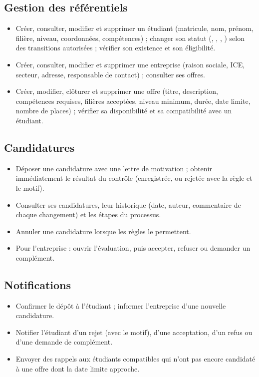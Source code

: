 \subsection{Gestion des référentiels}
\begin{itemize}
  \item Créer, consulter, modifier et supprimer un étudiant (matricule, nom, prénom, filière, niveau, coordonnées, compétences) ; changer son statut (, , , ) selon des transitions autorisées ; vérifier son existence et son éligibilité.
  \item Créer, consulter, modifier et supprimer une entreprise (raison sociale, ICE, secteur, adresse, responsable de contact) ; consulter ses offres.
  \item Créer, modifier, clôturer et supprimer une offre (titre, description, compétences requises, filières acceptées, niveau minimum, durée, date limite, nombre de places) ; vérifier sa disponibilité et sa compatibilité avec un étudiant.
\end{itemize}

\subsection{Candidatures}
\begin{itemize}
  \item Déposer une candidature avec une lettre de motivation ; obtenir immédiatement le résultat du contrôle (enregistrée, ou rejetée avec la règle et le motif).
  \item Consulter ses candidatures, leur historique (date, auteur, commentaire de chaque changement) et les étapes du processus.
  \item Annuler une candidature lorsque les règles le permettent.
  \item Pour l'entreprise : ouvrir l'évaluation, puis accepter, refuser ou demander un complément.
\end{itemize}

\subsection{Notifications}
\begin{itemize}
  \item Confirmer le dépôt à l'étudiant ; informer l'entreprise d'une nouvelle candidature.
  \item Notifier l'étudiant d'un rejet (avec le motif), d'une acceptation, d'un refus ou d'une demande de complément.
  \item Envoyer des rappels aux étudiants compatibles qui n'ont pas encore candidaté à une offre dont la date limite approche.
\end{itemize}

